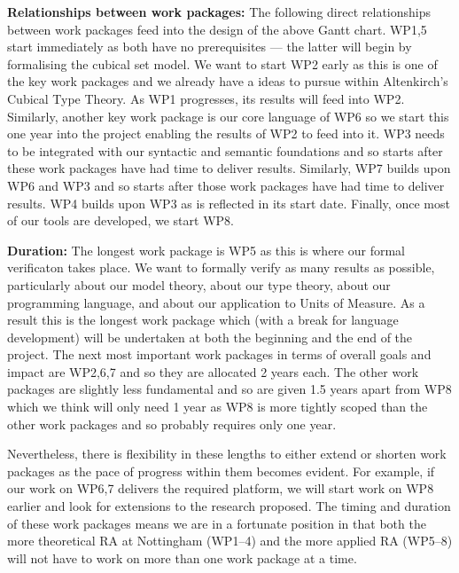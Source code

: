 \documentclass[a4paper,11pt]{article}
\begin{document}
\bigskip

{\bf Relationships between work packages:} The following direct
relationships between work packages feed into the design of the above
Gantt chart. WP1,5 start immediately as both have no prerequisites ---
the latter will begin by formalising the cubical set model. We want to
start WP2 early as this is one of the key work packages and we already
have a ideas to pursue within Altenkirch's Cubical Type Theory. As WP1
progresses, its results will feed into WP2. Similarly, another key
work package is our core language of WP6 so we start this one year into
the project enabling the results of WP2 to feed into it. WP3 needs to
be integrated with our syntactic and semantic foundations and so
starts after these work packages have had time to deliver
results. Similarly, WP7 builds upon WP6 and WP3 and so starts after
those work packages have had time to deliver results. WP4 builds upon
WP3 as is reflected in its start date. Finally, once most of our tools
are developed, we start WP8.

{\bf Duration:} The longest work package is WP5 as this is where our
formal verificaton takes place. We want to formally verify as many
results as possible, particularly about our model theory, about our
type theory, about our programming language, and about our application
to Units of Measure. As a result this is the longest work package which
(with a break for language development) will be undertaken at both the
beginning and the end of the project. The next most important
work packages in terms of overall goals and impact are WP2,6,7 and so
they are allocated 2 years each. The other work packages are slightly
less fundamental and so are given 1.5 years apart from WP8 which we think
will only need 1 year as WP8 is more tightly scoped than the other
work packages and so probably requires only one year.

Nevertheless, there is flexibility in these lengths to either extend
or shorten work packages as the pace of progress within them becomes
evident. For example, if our work on WP6,7 delivers the required
platform, we will start work on WP8 earlier and look for extensions
to the research proposed. The timing and duration of these work
packages means we are in a fortunate position in that both the more
theoretical RA at Nottingham (WP1--4) and the more applied RA (WP5--8)
will not have to work on more than one work package at a time.
\end{document}
